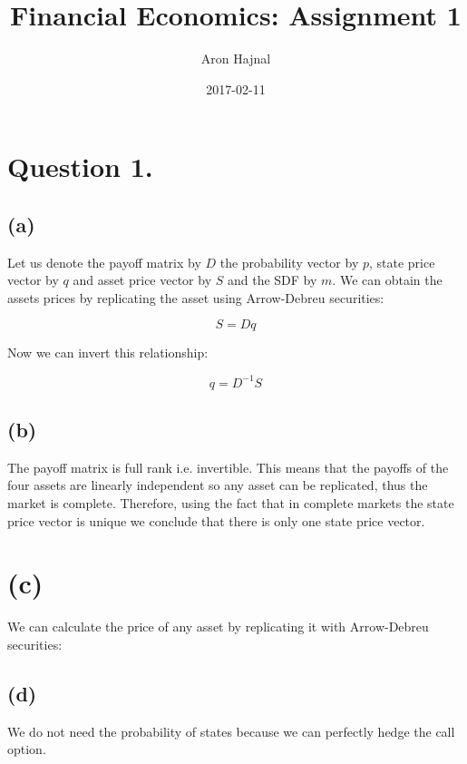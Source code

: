 \documentclass{article}
\title{Financial Economics: Assignment 1}
\date{2017-02-11}
\author{Aron Hajnal}
\begin{document}
 

\maketitle

\section{Question 1.}

\subsection{(a)}

Let us denote the payoff matrix by $D$ the probability vector by $p$, state price vector by $q$ and asset price vector by $S$ and the SDF by $m$. We can obtain the assets prices by replicating the asset using Arrow-Debreu securities:

\begin{equation}
S=Dq
\end{equation}

Now we can invert this relationship:

\begin{equation}
q = D^{-1} S
\end{equation}

\subsection{(b)}

The payoff matrix is full rank i.e. invertible. This means that the payoffs of the four assets are linearly independent so any asset can be replicated, thus the market is complete. Therefore, using the fact that in complete markets the state price vector is unique we conclude that there is only one state price vector.

\section{(c)}

We can calculate the price of any asset by replicating it with Arrow-Debreu securities:

\subsection{(d)}

We do not need the probability of states because we can perfectly hedge the call option.
\end{document}
